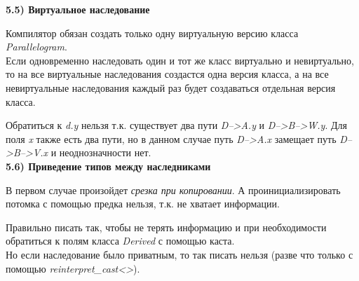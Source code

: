 \documentclass{article}
\begin{document}
\noindent \textbf{5.5) Виртуальное наследование}

Компилятор обязан создать только одну виртуальную версию класса \textit{Parallelogram}.\\
Если одновременно наследовать один и тот же класс виртуально и невиртуально, то на все виртуальные наследования создастся одна версия класса, а на все невиртуальные наследования каждый раз будет создаваться отдельная версия класса.

Обратиться к \textit{d.y} нельзя т.к. существует два пути \textit{D-->A.y} и \textit{D-->B-->W.y}. Для поля \textit{x} также есть два пути, но в данном случае путь \textit{D-->A.x} замещает путь \textit{D-->B-->V.x} и неоднозначности нет.\\
\noindent \textbf{5.6) Приведение типов между наследниками}

В первом случае произойдет \textit{срезка при копировании}. А проинициализировать потомка с помощью предка нельзя, т.к. не хватает информации.

Правильно писать так, чтобы не терять информацию и при необходимости обратиться к полям класса \textit{Derived} с помощью каста.\\
Но если наследование было приватным, то так писать нельзя (разве что только с помощью \textit{reinterpret\_cast<>}). 
\end{document}
